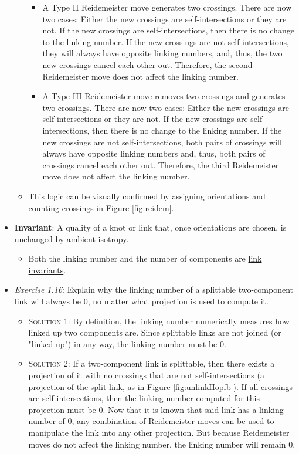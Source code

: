 \documentclass[titlepage]{article}
\numberwithin{figure}{section}
\numberwithin{table}{section}
\numberwithin{equation}{section}
\begin{document}
\begin{itemize}
\begin{itemize}
\begin{itemize}
            \item A Type II Reidemeister move generates two crossings. There are now two cases: Either the new crossings are self-intersections or they are not. If the new crossings are self-intersections, then there is no change to the linking number. If the new crossings are not self-intersections, they will always have opposite linking numbers, and, thus, the two new crossings cancel each other out. Therefore, the second Reidemeister move does not affect the linking number.
            \item A Type III Reidemeister move removes two crossings and generates two crossings. There are now two cases: Either the new crossings are self-intersections or they are not. If the new crossings are self-intersections, then there is no change to the linking number. If the new crossings are not self-intersections, both pairs of crossings will always have opposite linking numbers and, thus, both pairs of crossings cancel each other out. Therefore, the third Reidemeister move does not affect the linking number.
        \end{itemize}
        \item This logic can be visually confirmed by assigning orientations and counting crossings in Figure \ref{fig:reidem}.
    \end{itemize}
    \item \textbf{Invariant}: A quality of a knot or link that, once orientations are chosen, is unchanged by ambient isotropy.
    \begin{itemize}
        \item Both the linking number and the number of components are \underline{link invariants}.
    \end{itemize}
    \item \emph{Exercise 1.16}: Explain why the linking number of a splittable two-component link will always be $0$, no matter what projection is used to compute it.
    \begin{itemize}
        \item \textsc{Solution 1}: By definition, the linking number numerically measures how linked up two components are. Since splittable links are not joined (or "linked up") in any way, the linking number must be $0$.
        \item \textsc{Solution 2}: If a two-component link is splittable, then there exists a projection of it with no crossings that are not self-intersections (a projection of the split link, as in Figure \ref{fig:unlinkHopfb}). If all crossings are self-intersections, then the linking number computed for this projection must be $0$. Now that it is known that said link has a linking number of $0$, any combination of Reidemeister moves can be used to manipulate the link into any other projection. But because Reidemeister moves do not affect the linking number, the linking number will remain $0$.

\end{itemize}
\end{itemize}
\end{document}
